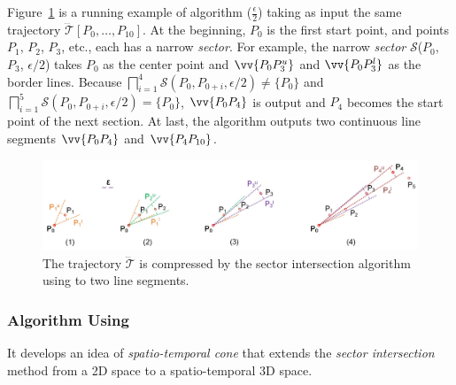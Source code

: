 \begin{example}
	\label{exm-alg-sleeve}
	Figure~\ref{fig:sleeve} is a running example of algorithm \siped($\frac{\epsilon}{2}$) taking as input the same trajectory $\dddot{\mathcal{T}}[P_0, \ldots, P_{10}]$. At the beginning, $P_0$ is the first start point, and points $P_1$, $P_2$, $P_3$, etc., each has a narrow \emph{sector}.
	For example, the narrow \emph{sector} $\mathcal{S}$($P_0$, $P_{3}$, $\epsilon/2$) takes $P_0$ as the center point and $\vv{P_0P^u_{3}}$ and $\vv{P_0P^l_{3}}$ as the border lines.
	Because $\bigsqcap_{i=1}^{4}\mathcal{S}(P_0, P_{0+i}, \epsilon/2) \ne \{P_0\}$ and $\bigsqcap_{i=1}^{5}\mathcal{S}(P_0, P_{0+i}, \epsilon/2) = \{P_0\}$, $\vv{P_0P_4}$ is output and $P_4$ becomes the start point of the next section.
	At last, the algorithm outputs two continuous line segments $\vv{P_0P_4}$ and $\vv{P_4P_{10}}$.
\end{example}

\begin{figure}[tb!]
	\centering
	\includegraphics[scale=0.66]{Figures/Fig-sleeve.jpg}
	\vspace{-2ex}
	\caption{\small The trajectory $\dddot{\mathcal{T}}$ is compressed by the sector intersection algorithm using \ped to two line segments.}
	\vspace{-1ex}
	\label{fig:sleeve}
\end{figure}




\subsubsection{Algorithm \cised Using \sed \cite{Lin:Cised}}
It develops an idea of \textit{spatio-temporal cone} that extends the \textit{sector intersection} method \cite{Williams:Longest, Sklansky:Cone, Dunham:Cone, Zhao:Sleeve} from a 2D space to a spatio-temporal 3D space.

